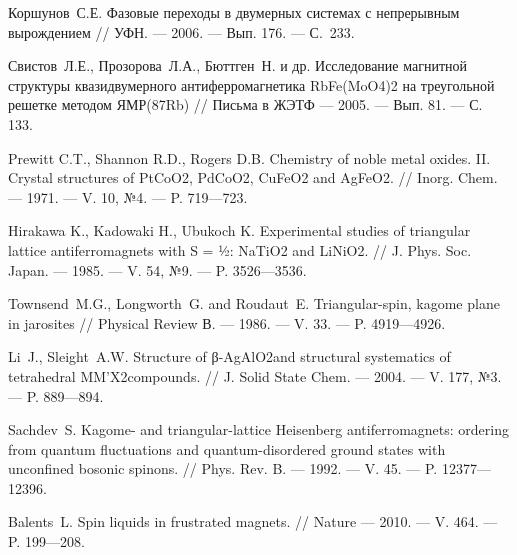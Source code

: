 \begin{thebibliography}{111}

%
%
%
%
%




Коршунов~С.Е. 
Фазовые переходы в двумерных системах с непрерывным вырождением 
// 
УФН. 
--- 2006.
--- Вып. 176. 
--- С.~233.

Свистов~Л.Е., Прозорова~Л.А., Бюттген~Н. и др. 
Исследование магнитной структуры квазидвумерного антиферромагнетика RbFe(MoO4)2 на треугольной решетке методом ЯМР(87Rb) 
// 
Письма в ЖЭТФ 
--- 2005.
--- Вып. 81.
--- С. 133.

Prewitt C.T., Shannon R.D., Rogers D.B.
Chemistry of noble metal oxides. II. Crystal structures of PtCoO2, PdCoO2, CuFeO2 and AgFeO2.
//
Inorg. Chem.
--- 1971.
--- V. 10, №4.
--- P. 719---723.

Hirakawa K., Kadowaki H., Ubukoch K.
Experimental studies of triangular lattice antiferromagnets with S = ½: NaTiO2 and LiNiO2.
//
J. Phys. Soc. Japan.
--- 1985.
--- V. 54, №9.
--- P. 3526---3536.

Townsend~M.G., Longworth~G. and Roudaut~E.
Triangular-spin, kagome plane in jarosites 
// 
Physical Review В.
--- 1986.
--- V. 33.
--- P. 4919---4926.

Li~J., Sleight~A.W. 
Structure of β-AgAlO2and structural systematics of tetrahedral MM'X2compounds. 
// 
J. Solid State Chem. 
--- 2004. 
--- V. 177, №3.
--- P. 889---894.

Sachdev~S. 
Kagome- and triangular-lattice Heisenberg antiferromagnets: ordering from quantum fluctuations and quantum-disordered ground states with unconfined bosonic spinons. 
//
Phys. Rev. B.
--- 1992.
--- V. 45.
--- P. 12377---12396.

Balents~L. 
Spin liquids in frustrated magnets.
// 
Nature
--- 2010.
--- V. 464.
--- P. 199---208.


\end{thebibliography}
